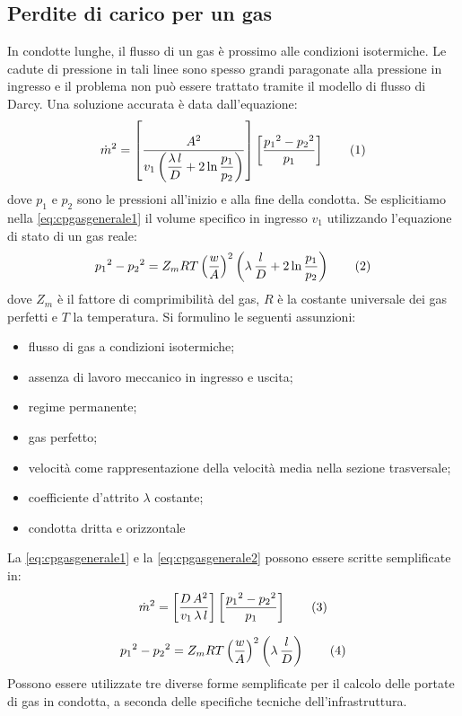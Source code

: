 \subsection{Perdite di carico per un gas}
In condotte lunghe, il flusso di un gas è prossimo alle condizioni isotermiche. Le cadute di pressione in tali linee sono spesso grandi paragonate alla pressione in ingresso e il problema non può essere trattato tramite il modello di flusso di Darcy. Una soluzione accurata è data dall'equazione:
\[\dot{m}^2=\left[\dfrac{A^2}{v_1\left(\dfrac{\lambda\,l}{D}+2\ln\dfrac{p_1}{p_2}\right)}\right]\left[\dfrac{{p_1}^2-{p_2}^2}{p_1}\right] \addtag \label{eq:cpgasgenerale1}\]
dove \(p_1\) e \(p_2\) sono le pressioni all'inizio e alla fine della condotta.
Se esplicitiamo nella \eqref{eq:cpgasgenerale1} il volume specifico in ingresso \(v_1\) utilizzando l'equazione di stato di un gas reale:
\[{p_1}^2-{p_2}^2=Z_m R T \left(\dfrac{w}{A}\right)^2\left(\lambda \, \dfrac{l}{D}+2\ln\dfrac{p_1}{p_2}\right)  \addtag \label{eq:cpgasgenerale2}\]
dove \(Z_m\) è il fattore di comprimibilità del gas, \(R\) è la costante universale dei gas perfetti e \(T\) la temperatura.
Si formulino le seguenti assunzioni:
\begin{itemize}
    \item flusso di gas a condizioni isotermiche;
    \item assenza di lavoro meccanico in ingresso e uscita;
    \item regime permanente;
    \item gas perfetto;
    \item velocità come rappresentazione della velocità media nella sezione trasversale;
    \item coefficiente d'attrito \(\lambda\) costante;
    \item condotta dritta e orizzontale
\end{itemize}
La \eqref{eq:cpgasgenerale1} e la \eqref{eq:cpgasgenerale2} possono essere scritte semplificate in:
\[\dot{m}^2=\left[ \dfrac{D \, A^2}{v_1 \, \lambda \, l}\right] \left[\dfrac{{p_1}^2-{p_2}^2}{p_1}\right] \addtag \label{eq:cpgassempl1} \]

\[{p_1}^2-{p_2}^2=Z_m R T \left(\dfrac{w}{A}\right)^2\left(\lambda \, \dfrac{l}{D}\right)  \addtag \label{eq:cpgassempl2}\]
Possono essere utilizzate tre diverse forme semplificate per il calcolo delle portate di gas in condotta, a seconda delle specifiche tecniche dell'infrastruttura.

